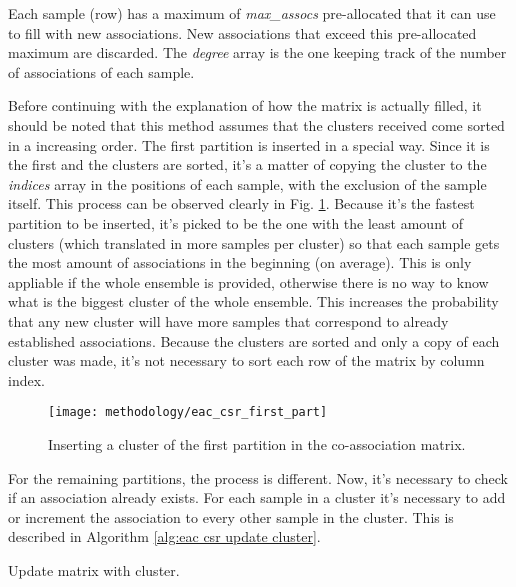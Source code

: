 Each sample (row) has a maximum of \emph{max\_assocs} pre-allocated that it can use to fill with new associations.
New associations that exceed this pre-allocated maximum are discarded.
The \emph{degree} array is the one keeping track of the number of associations of each sample.

Before continuing with the explanation of how the matrix is actually filled, it should be noted that this method assumes that the clusters received come sorted in a increasing order.
The first partition is inserted in a special way.
Since it is the first and the clusters are sorted, it's a matter of copying the cluster to the \emph{indices} array in the positions of each sample, with the exclusion of the sample itself.
This process can be observed clearly in Fig. \ref{fig:first part}.
Because it's the fastest partition to be inserted, it's picked to be the one with the least amount of clusters (which translated in more samples per cluster) so that each sample gets the most amount of associations in the beginning (on average).
This is only appliable if the whole ensemble is provided, otherwise there is no way to know what is the biggest cluster of the whole ensemble.
This increases the probability that any new cluster will have more samples that correspond to already established associations.
Because the clusters are sorted and only a copy of each cluster was made, it's not necessary to sort each row of the matrix by column index.

\begin{figure}[hbtp]
\centering
\texttt{[image: methodology/eac\_csr\_first\_part]}
\caption{Inserting a cluster of the first partition in the co-association matrix.}
\label{fig:first part}
\end{figure}

For the remaining partitions, the process is different.
Now, it's necessary to check if an association already exists.
For each sample in a cluster it's necessary to add or increment the association to every other sample in the cluster.
This is described in Algorithm \ref{alg:eac csr update cluster}.


\begin{algorithm}
\caption{Update matrix with cluster.}\label{alg:eac csr update cluster}
\begin{algorithmic}[1]
		\Else
            \EndIf
		\EndIf
	\EndFor
\EndFor
\EndProcedure
\end{algorithmic}
\end{algorithm}

